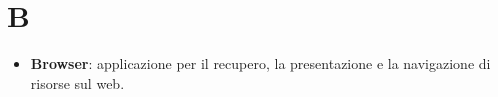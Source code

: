 \section{B}
\begin{itemize} 
	\item
	\textbf{Browser}: applicazione per il recupero, la presentazione e la navigazione di risorse sul web.
\end{itemize}